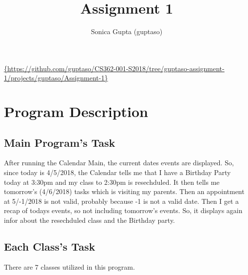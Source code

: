 \documentclass[12pt]{article}
\title{Assignment 1}
\author{Sonica Gupta (guptaso) }
\begin{document}
\maketitle 
\centerline{\url{{https://github.com/guptaso/CS362-001-S2018/tree/guptaso-assignment-1/projects/guptaso/Assignment-1}}}
\tableofcontents

\section{Program Description}

\subsection{Main Program's Task}
After running the Calendar Main, the current dates events are displayed. So, since today is 4/5/2018, the Calendar tells me that I have a Birthday Party today at 3:30pm and my class to 2:30pm is resechduled. It then tells me tomorrow's (4/6/2018) tasks which is visiting my parents. Then an appointment at 5/-1/2018 is not valid, probably because -1 is not a valid date. Then I get a recap of todays events, so not including tomorrow's events. So, it displays again infor about the resechduled class and the Birthday party. 


\subsection{Each Class's Task}
There are 7 classes utilized in this program.
\end{document}
